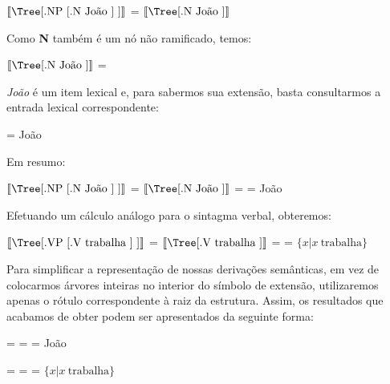 \begin{exe}
	\ex $\left \llbracket \vcenter{%
		\hbox{\Tree [.NP [.N João ] ]}} \right \rrbracket$ = $\left \llbracket \vcenter{%
		\hbox{\Tree [.N João ]}} \right \rrbracket$
\end{exe}


\n Como \textbf{N} também é um nó não ramificado, temos:

\begin{exe}
	\ex $\left \llbracket \vcenter{%
	\hbox{\Tree [.N João ]}} \right \rrbracket$ = 
\end{exe}


\n \textit{João} é um item lexical e, para sabermos sua extensão,
basta consultarmos a entrada lexical correspondente:

\begin{exe}
	\ex {} = João
\end{exe}

\n Em resumo:

\begin{exe}
	\ex $\left \llbracket \vcenter{%
	\hbox{\Tree [.NP [.N João ] ]}} \right \rrbracket$ = $\left \llbracket \vcenter{%
	\hbox{\Tree [.N João ]}} \right \rrbracket$ =  = João
\end{exe}


\n Efetuando um cálculo análogo para o sintagma verbal, obteremos:

\begin{exe}
	\ex $\left \llbracket \vcenter{%
	\hbox{\Tree [.VP [.V trabalha ] ]}} \right \rrbracket$ = $\left \llbracket \vcenter{%
	\hbox{\Tree [.V trabalha ]}} \right \rrbracket$ =  = $\{x | x\ \text{trabalha}\}$
\end{exe}



\n Para simplificar a representa\-ção de nossas deriva\-çõ\-es
semânticas, em vez de colocarmos árvores inteiras no interior do
símbolo de extensão, utilizaremos apenas o rótulo correspondente à
raiz da estrutura. Assim, os resultados que acabamos de obter
podem ser apresentados da seguinte forma:

\begin{exe}
	\ex {} =  =  = João
\end{exe}

\begin{exe}
	\ex {} =  =  = $\{x | x\ \text{trabalha}\}$
\end{exe}

